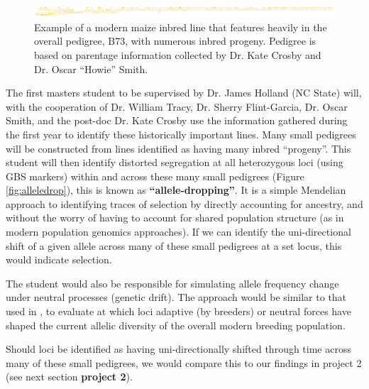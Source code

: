 \documentclass[12pt]{article}
\begin{document}
\begin{figure}[ht]
\includegraphics[width=1.0\linewidth]{pedigree_poster.pdf}
\caption{Example of a modern maize inbred line that features heavily in the overall pedigree, B73, with numerous inbred progeny. Pedigree is based on parentage information collected by Dr. Kate Crosby and Dr. Oscar ``Howie'' Smith.}
\label{fig:b73isbig}
\end{figure}


The first masters student to be supervised by Dr. James Holland (NC State) will, with the cooperation of Dr. William Tracy, Dr. Sherry Flint-Garcia, Dr. Oscar Smith, and the post-doc Dr. Kate Crosby use the information gathered during the first year to identify these historically important lines. 
Many small pedigrees will be constructed from lines identified as having many inbred ``progeny''. 
This student will then identify distorted segregation at all heterozygous loci (using GBS markers) within and across these many small pedigrees (Figure \ref{fig:alleledrop}), this is known as \textbf{``allele-dropping''}. 
It is a simple Mendelian approach to identifying traces of selection by directly accounting for ancestry, and without the worry of having to account for shared population structure (as in modern population genomics approaches). 
If we can identify the uni-directional shift of a given allele across many of these small pedigrees at a set locus, this would indicate selection. 

The student would also be responsible for simulating allele frequency change under neutral processes (genetic drift). The approach would be similar to that used in \citep{Gerke:2013tw}, to evaluate at which loci adaptive (by breeders) or neutral forces have shaped the current allelic diversity of the overall modern breeding population. 

Should loci be identified as having uni-directionally shifted through time across many of these small pedigrees, we would compare this to our findings in project 2 (see next section \textbf{project 2}).
\end{document}
